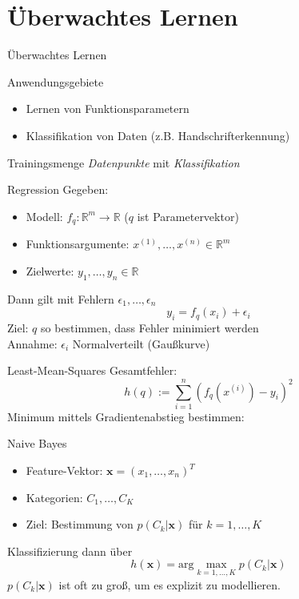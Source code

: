 \documentclass[xcolor={dvipsnames,svgnames},draft]{beamer}
\begin{document}
\section{Überwachtes Lernen}

\begin{frame}{Überwachtes Lernen}

  \begin{exampleblock}{Anwendungsgebiete}
    \begin{itemize}
    \item Lernen von Funktionsparametern
    \item Klassifikation von Daten (z.B. Handschrifterkennung)
    \end{itemize}
  \end{exampleblock}

  \begin{block}{Trainingsmenge}
    \textit{Datenpunkte} mit \textit{Klassifikation}
  \end{block}

\end{frame}

\begin{frame}{Regression}
  Gegeben:
  \begin{itemize}
  \item Modell: $f_q : \mathbb{R}^m \to \mathbb{R} $ ($q$ ist Parametervektor)
  \item Funktionsargumente: $x^{(1)},\ldots,x^{(n)} \in \mathbb{R}^m$ \\
  \item Zielwerte: $y_1,\ldots, y_n \in \mathbb{R}$ \\
  \end{itemize}
  \vspace{1em}

  Dann gilt mit Fehlern $\epsilon_1,\ldots,\epsilon_n$
  \[
    y_i = f_q(x_i) + \epsilon_i
  \]
  Ziel: $q$ so bestimmen, dass Fehler minimiert werden \\
  Annahme: $\epsilon_i$ Normalverteilt (Gaußkurve)
\end{frame}

\begin{frame}{Least-Mean-Squares}
  Gesamtfehler:
  \[
    h(q) := \sum_{i=1}^n (f_q(x^{(i)}) - y_i)^2
  \]
  Minimum mittels Gradientenabstieg bestimmen:
\end{frame}

\begin{frame}{Naive Bayes}
  \begin{itemize}
  \item Feature-Vektor: $\mathbf{x} = (x_1,\ldots,x_n)^T$
  \item Kategorien: $C_1,\ldots,C_K$
  \item Ziel: Bestimmung von $p(C_k\vert \mathbf{x})$ für $k=1,\ldots,K$
  \end{itemize}
  Klassifizierung dann über
  \[
    h(\mathbf{x}) = \text{arg}\max_{k=1,\ldots,K} p(C_k\vert \mathbf{x})
  \]
  $p(C_k\vert \mathbf{x})$ ist oft zu groß, um es explizit zu modellieren.
\end{frame}
\end{document}
